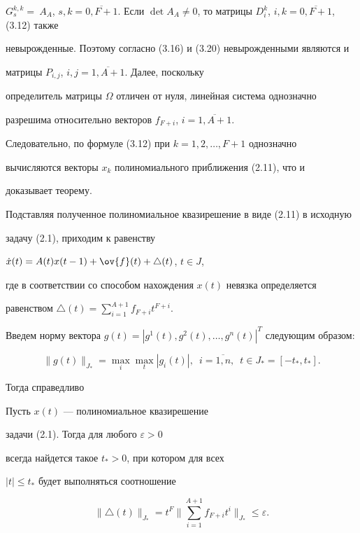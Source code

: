 $G_{s}^{k,k}=~A_{A}$, $s,k=\overline{0,F+1}$. Если $\det A_{A} \neq


0$, то матрицы  $D_{i}^{k}$, $i,k=\overline{0,F+1}$, (3.12) также


невырожденные. Поэтому согласно (3.16) и (3.20) невырожденными являются и


матрицы $P_{i,j}$, $i,j=\overline{1,A+1}$. Далее, поскольку


определитель матрицы $\Omega$ отличен от нуля, линейная система однозначно


разрешима относительно векторов $f_{F+i}$, $i=\overline{1,A+1}$.


Следовательно, по формуле (3.12) при $k=1,2,\dotsc, F+1$ однозначно


вычисляются векторы $x_{k}$ полиномиального приближения (2.11), что и


доказывает теорему.


\medskip





Подставляя полученное полиномиальное квазирешение в виде (2.11) в исходную


задачу (2.1), приходим к равенству


$\Dot{x}(t)=A(t)x(t-1)+\ov{f}(t) +\triangle(t)$, $t\in J$,


где в соответствии со способом нахождения $x(t)$ невязка определяется


равенством $\triangle (t)=\sum\limits_{i=1}^{A+1}f_{F+i}t^{F+i}$.





Введем норму вектора $g(t)=| g^1(t),g^2(t),


\dotsc,g^n(t)|^{T}$ следующим образом:


$$


\| g(t)\|_{J_*}=\max_i\max_t|g_i(t)|,\ \;


i=\overline{1,n},\ \;t\in J_*=[-t_*,t_*].


$$


Тогда справедливо





\begin{cors}


Пусть $x(t)$ --- полиномиальное квазирешение


задачи (2.1). Тогда для любого $\varepsilon >0$


всегда найдется такое $t_{*}>0$, при котором для всех


$|t|\leq t_{*}$ будет выполняться соотношение


$$


\| \triangle(t)\|_{J_*}=t^{F}\bigg\|


\sum_{i=1}^{A+1}f_{F+i}t^{i}\bigg\|_{J_*} \leq \varepsilon.


$$


\end{cors}





